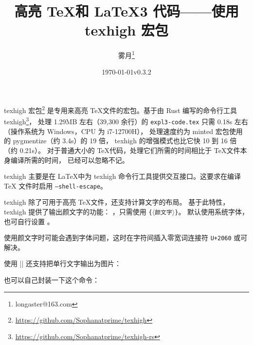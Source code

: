 \documentclass[zihao=-4,fontset=fandol]{ctexart}
\begin{document}
\title{高亮 \TeX 和 \LaTeX3 代码——使用\textsf{texhigh} 宏包}
\author{雾月\thanks{longaster@163.com}}
\date{\today\quad v0.3.2}
\maketitle

\textsf{texhigh} 宏包\footnote{\url{https://github.com/Sophanatprime/texhigh}}%
是专用来高亮 \TeX 文件的宏包。基于由 Rust 编写的命令行工具
texhigh\footnote{\url{https://github.com/Sophanatprime/texhigh-rs}}，
处理 1.29MB 左右（39,300 余行）的 \texttt{expl3-code.tex} 只需 0.18s 左右
（操作系统为 Windows，CPU 为 i7-12700H），
处理速度约为 \textsf{minted} 宏包使用的 pygmentize（约 3.4s）的 19 倍，
texhigh 的增强模式也比它快 10 到 16 倍（约 0.21s）。
对于普通大小的 \TeX 代码，处理它们所需的时间相比于 \TeX 文件本身编译所需的时间，
已经可以忽略不记。

\textsf{texhigh} 主要是在 \LaTeX 中为 texhigh 命令行工具提供交互接口。这要求在编译 \TeX
文件时启用 \texttt{--shell-escape}。

texhigh 除了可用于高亮 \TeX 文件，还支持计算文字的布局。
基于此特性，\textsf{texhigh} 提供了输出颜文字的功能：
 ，只需使用 \texhighverb{\kaomoji}\texttt\{\ensuremath{\langle}\verb|颜文字|\ensuremath{\rangle}\texttt\}。
默认使用系统字体，也可自行设置 。

\quad
{}\quad
{}\quad
{}\quad
{}

使用颜文字时可能会遇到字体问题，这时在字符间插入零宽词连接符 \texttt{U+2060} 或可解决。

使用 \texhighverb|\kaomoji*| 还支持把单行文字输出为图片：
\begin{examcode}[texhigh options={
  char-category*={emoji}{[\p{Emoji}--\p{ASCII}]}{\mbox{\emojifont #1}} %
}]{}

\end{examcode}

也可以自己封装一下这个命令：
\end{document}
